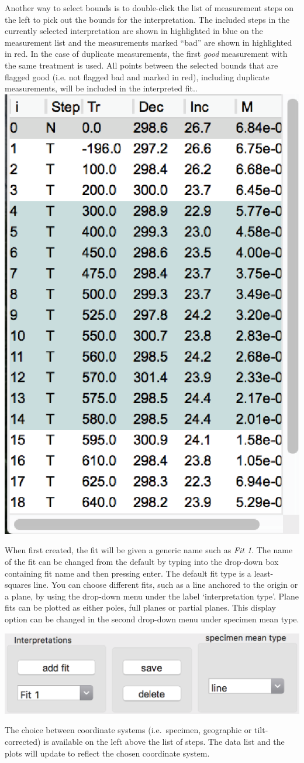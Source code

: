 \documentclass[11pt]{book}
\begin{document}
Another way to select bounds is to double-click the list of measurement steps on the left to pick out the bounds for the interpretation. The included steps in the currently selected interpretation are shown in highlighted in blue on the measurement list and the measurements marked ``bad'' are shown in highlighted in red. In the case of duplicate measurements, the first \emph{good} measurement with the same treatment is used. All points between the selected bounds that are flagged good (i.e. not flagged bad and marked in red), including duplicate measurements, will be included in the interpreted fit..\\
\includegraphics[width=5 cm]{EPSfiles/demag_gui_DataBox.eps}

When first created, the fit will be given a generic name such as
\emph{Fit 1}. The name of the fit can be changed from the default by typing into the drop-down box containing fit name and then pressing enter. The default fit type is a least-squares line. You can choose different fits, such as a line anchored to the origin or a plane, by using the drop-down menu under the label `interpretation type'. Plane fits can be plotted as either poles, full planes or partial planes. This display option can be changed in the second drop-down menu under specimen mean type.

\includegraphics[width=10 cm]{EPSfiles/demag_gui_SpecimenMeanType.eps}

The choice between coordinate systems (i.e.~specimen, geographic or tilt-corrected) is available on the left above the list of steps. The data list and the plots will update to reflect the chosen coordinate system.
\end{document}

